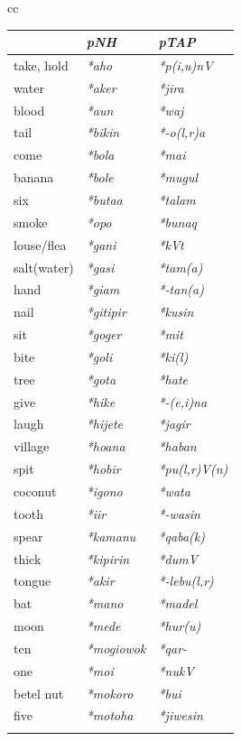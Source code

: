 \begin{table}\centering
\footnotesize
\begin{tabular}{cc}
\mytopline
\begin{tabular}{l>{\it}l>{\it}l}
 	&  \rm \textbf{pNH\ilt{proto-North-Halmahera}}	& \rm \textbf{pTAP\ilt{proto-Timor Alor Pantar}}\\
    \midrule
take, hold&   *aho	&   *p(i,u)nV {\ddag}\\
water	&   *aker	&  *jira\\
blood	&  *aun	&  *waj\\
tail	&  *bikin	&  *-o(l,r)a\footnotemark{}\\
come	&  *bola	&  *mai {\ddag}\\
banana	&  *bole{\ddag}	&  *mugul\\
six	&  *buta{\ng}a	&  *talam\\
smoke	&  *{\dDOT}opo	&  *bunaq {\ddag}\\
louse/flea	&  *gani	&  *kVt {\ddag}\\
salt(water)	&  *gasi	&  *tam(a)\\
hand	&  *giam	&  *-tan(a)\\
nail	&  *gitipir	&  *kusin {\ddag}\\
sit	&  *goger	&  *mit\\
bite	&  *goli	&  *ki(l)\\
tree	&  *gota	&  *hate\\
give	&  *hike	&  *-(e,i)na\\
laugh	&  *hijete	&  *jagir\\
village	&  *hoana{\ddag}	&  *haban {\ddag}\\
spit	&  *hobir	&  *pu(l,r)V(n)\\
coconut	&  *igono{\ddag}	&  *wata\\
tooth	&  *i{\ng}ir	&  *-wasin\\
spear	&  *kamanu	&  *qaba(k){\ddag}\\
thick	&  *kipirin	&  *dumV{\ddag}\\
tongue	&  *akir	&  *-lebu(l,r)\\
bat	&  *mano {\ddag}	&  *madel\\
moon	&  *mede	&  *hur(u)\\
ten	&  *mogiowok	&  *qar- {\ddag}\\
one	&  *moi	&  *nukV\\
betel nut	&  *mokoro{\ddag}	&  *bui {\ddag}\\
five	&  *motoha	&  *jiwesin {\ddag}\\
 \\
\end{tabular}


\end{tabular}
\end{table}
